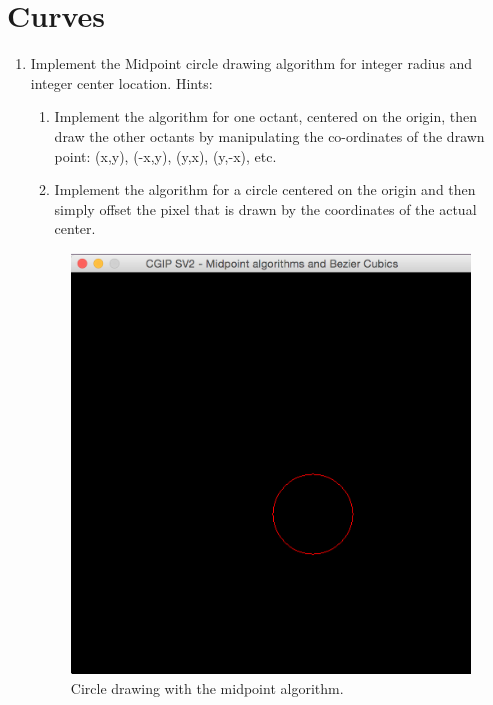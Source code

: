 \documentclass[11pt]{article}
\begin{document}
\section{Curves}
\begin{enumerate}
	\item Implement the Midpoint circle drawing algorithm for integer radius and integer center location. 
	Hints: 
	\begin{enumerate}
		\item Implement the algorithm for one octant, centered on the origin, then draw the other octants by manipulating the co-ordinates of the drawn point: (x,y), (-x,y), (y,x), (y,-x), etc.
		\item Implement the algorithm for a circle centered on the origin and then simply offset the pixel that is drawn by the coordinates of the actual center.
	\end{enumerate}
	\begin{figure}[!htbp]
		\begin{center}
			\includegraphics[scale=0.4]{circle}
		\end{center}
		\caption{Circle drawing with the midpoint algorithm.}
	\end{figure}


\end{enumerate}
\end{document}
